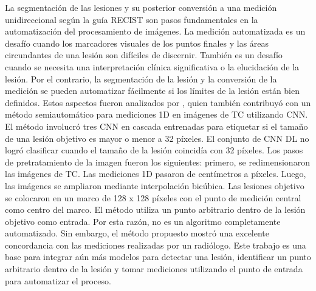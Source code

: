\documentclass[11pt,a4paper,openany]{article}
\begin{document}
        La segmentación de las lesiones y su posterior conversión a una medición unidireccional según la guía RECIST son pasos fundamentales en la automatización del procesamiento de imágenes. La medición automatizada es un desafío cuando los marcadores visuales de los puntos finales y las áreas circundantes de una lesión son difíciles de discernir. También es un desafío cuando se necesita una interpretación clínica significativa o la elucidación de la lesión. Por el contrario, la segmentación de la lesión y la conversión de la medición se pueden automatizar fácilmente si los límites de la lesión están bien definidos. Estos aspectos fueron analizados por \cite{Woo2021}, quien también contribuyó con un método semiautomático para mediciones 1D en imágenes de TC utilizando CNN. El método involucró tres CNN en cascada entrenadas para etiquetar si el tamaño de una lesión objetivo es mayor o menor a 32 píxeles. El conjunto de CNN DL no logró clasificar cuando el tamaño de la lesión coincidía con 32 píxeles. Los pasos de pretratamiento de la imagen fueron los siguientes: primero, se redimensionaron las imágenes de TC. Las mediciones 1D pasaron de centímetros a píxeles. Luego, las imágenes se ampliaron mediante interpolación bicúbica. Las lesiones objetivo se colocaron en un marco de 128 x 128 píxeles con el punto de medición central como centro del marco. El método utiliza un punto arbitrario dentro de la lesión objetivo como entrada. Por esta razón, no es un algoritmo completamente automatizado. Sin embargo, el método propuesto mostró una excelente concordancia con las mediciones realizadas por un radiólogo. Este trabajo es una base para integrar aún más modelos para detectar una lesión, identificar un punto arbitrario dentro de la lesión y tomar mediciones utilizando el punto de entrada para automatizar el proceso. \\
\end{document}
